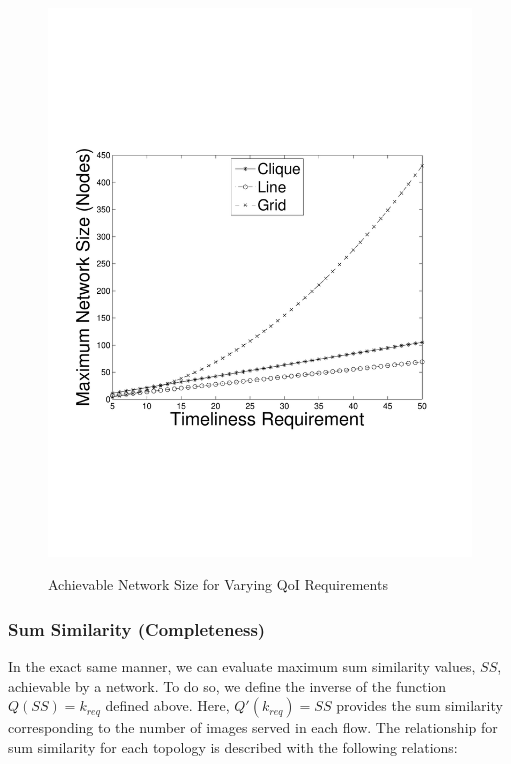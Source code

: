 \begin{figure}[ht]
{	\includegraphics[scale=0.31, clip=true, trim=15mm 65mm 20mm 65mm]{figures/use_cases_examples/num_nodes_vs_tness_5_SS_12_IS.pdf}
	}
\caption{Achievable Network Size for Varying QoI Requirements}
 \label{fig:use_case_num_nodes_vs_qoi}
    \vspace{-7mm}
\end{figure}

\subsubsection{Sum Similarity (Completeness)}

In the exact same manner, we can evaluate maximum sum similarity values, $SS$, achievable by a network.  To do so, we define the inverse of the function $Q(SS) = k_{req}$ defined above.  Here, $Q'(k_{req}) = SS$ provides the sum similarity corresponding to the number of images served in each flow.  The relationship for sum similarity for each topology is described with the following relations:

